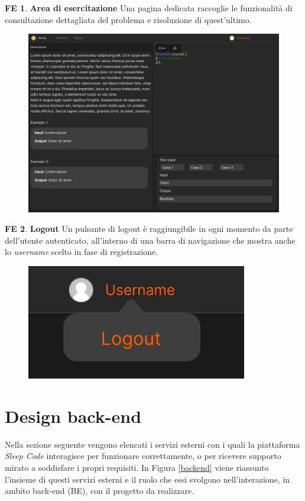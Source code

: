 \documentclass[11pt, a4paper]{article}
\theoremstyle{definition}
\newtheorem{frontend}{FE}
\begin{document}
\begin{frontend}
\label{exepage}
\textbf{Area di esercitazione }
Una pagina dedicata raccoglie le funzionalità di consultazione dettagliata
del problema e risoluzione di quest'ultimo.
\end{frontend}
\begin{figure}[H]
\centering
\includegraphics[scale=0.195]{materiale/immaginife/esercitazione.jpeg}
\end{figure}

\newpage


\begin{frontend}
\textbf{Logout }
Un pulsante di logout è raggiungibile in ogni momento da parte dell'utente
autenticato, all'interno di una barra di navigazione che mostra anche lo
\textit{username} scelto in fase di registrazione.
\end{frontend}
\begin{figure}[H]
\centering
\includegraphics[scale=0.2]{materiale/immaginife/logout.jpeg}
\end{figure}

\newpage
\section{Design back-end}
Nella sezione seguente vengono elencati i servizi esterni con i quali
la piattaforma \textit{Sleep Code} interagisce per funzionare
correttamente, o per ricevere supporto mirato a soddisfare i propri requisiti.
In Figura \ref{backend} viene riassunto l'insieme di questi servizi esterni
e il ruolo che essi svolgono nell'interazione, in ambito back-end (BE),
con il progetto da realizzare.
\end{document}
